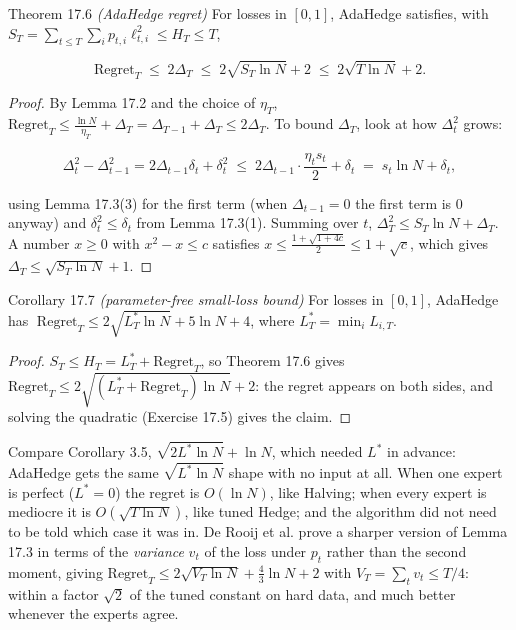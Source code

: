 \documentclass[11pt,a4paper,openany]{book}
\newcommand{\Reg}{\mathrm{Regret}}
\begin{document}
\begin{bthm}{Theorem 17.6 \emph{(AdaHedge regret)}}
For losses in $[0,1]$, AdaHedge satisfies, with $S_T=\sum_{t\le T}\sum_ip_{t,i}\ell_{t,i}^2\le H_T\le T$,

\[\Reg_T\;\le\;2\Delta_T\;\le\;2\sqrt{S_T\ln N}+2\;\le\;2\sqrt{T\ln N}+2.\]

\end{bthm}

\begin{proof}
By Lemma 17.2 and the choice of $\eta_T$, $\Reg_T\le\frac{\ln N}{\eta_T}+\Delta_T=\Delta_{T-1}+\Delta_T\le2\Delta_T$. To bound $\Delta_T$, look at how $\Delta_t^2$ grows:

\[\Delta_t^2-\Delta_{t-1}^2=2\Delta_{t-1}\delta_t+\delta_t^2\;\le\;2\Delta_{t-1}\cdot\frac{\eta_ts_t}{2}+\delta_t\;=\;s_t\ln N+\delta_t,\]

using Lemma 17.3(3) for the first term (when $\Delta_{t-1}=0$ the first term is $0$ anyway) and $\delta_t^2\le\delta_t$ from Lemma 17.3(1). Summing over $t$, $\Delta_T^2\le S_T\ln N+\Delta_T$. A number $x\ge0$ with $x^2-x\le c$ satisfies $x\le\frac{1+\sqrt{1+4c}}2\le1+\sqrt c$, which gives $\Delta_T\le\sqrt{S_T\ln N}+1$.
\end{proof}

\begin{bthm}{Corollary 17.7 \emph{(parameter-free small-loss bound)}}
For losses in $[0,1]$, AdaHedge has $\;\Reg_T\le2\sqrt{L^*_T\ln N}+5\ln N+4$, where $L^*_T=\min_iL_{i,T}$.
\end{bthm}

\begin{proof}
$S_T\le H_T=L^*_T+\Reg_T$, so Theorem 17.6 gives $\Reg_T\le2\sqrt{(L^*_T+\Reg_T)\ln N}+2$: the regret appears on both sides, and solving the quadratic (Exercise 17.5) gives the claim.
\end{proof}

Compare Corollary 3.5, $\sqrt{2L^*\ln N}+\ln N$, which needed $L^*$ in advance: AdaHedge gets the same $\sqrt{L^*\ln N}$ shape with no input at all. When one expert is perfect ($L^*=0$) the regret is $O(\ln N)$, like Halving; when every expert is mediocre it is $O(\sqrt{T\ln N})$, like tuned Hedge; and the algorithm did not need to be told which case it was in. De Rooij et al. prove a sharper version of Lemma 17.3 in terms of the \emph{variance} $v_t$ of the loss under $p_t$ rather than the second moment, giving $\Reg_T\le2\sqrt{V_T\ln N}+\frac43\ln N+2$ with $V_T=\sum_tv_t\le T/4$: within a factor $\sqrt2$ of the tuned constant on hard data, and much better whenever the experts agree.
\end{document}
